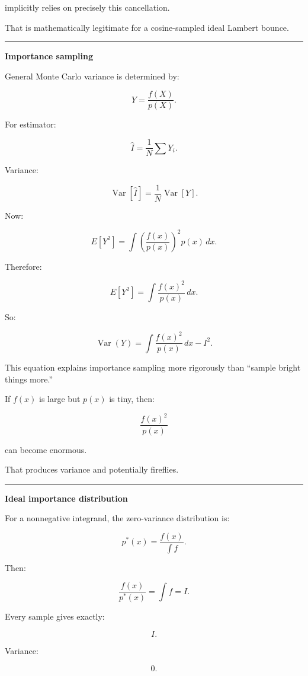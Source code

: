implicitly relies on precisely this cancellation.

That is mathematically legitimate for a cosine-sampled ideal Lambert bounce.

\begin{center}\rule{0.5\linewidth}{0.5pt}\end{center}

\textbf{Importance sampling}

General Monte Carlo variance is determined by:

\[
Y=
\frac{f(X)}{p(X)}.
\]

For estimator:

\[
\hat I=\frac1N\sum Y_i.
\]

Variance:

\[
\operatorname{Var}[\hat I]
=
\frac{1}{N}
\operatorname{Var}[Y].
\]

Now:

\[
E[Y^2]
=
\int
\left(
\frac{f(x)}{p(x)}
\right)^2
p(x)\,dx.
\]

Therefore:

\[
E[Y^2]
=
\boxed{
\int
\frac{f(x)^2}{p(x)}
\,dx.
}
\]

So:

\[
\boxed{
\operatorname{Var}(Y)
=
\int
\frac{f(x)^2}{p(x)}
\,dx
-
I^2.
}
\]

This equation explains importance sampling more rigorously than ``sample bright things more.''

If \(f(x)\) is large but \(p(x)\) is tiny, then:

\[
\frac{f(x)^2}{p(x)}
\]

can become enormous.

That produces variance and potentially fireflies.

\begin{center}\rule{0.5\linewidth}{0.5pt}\end{center}

\textbf{Ideal importance distribution}

For a nonnegative integrand, the zero-variance distribution is:

\[
\boxed{
p^*(x)
=
\frac{
f(x)
}{
\int f
}.
}
\]

Then:

\[
\frac{f(x)}{p^*(x)}
=
\int f
=
I.
\]

Every sample gives exactly:

\[
I.
\]

Variance:

\[
0.
\]

